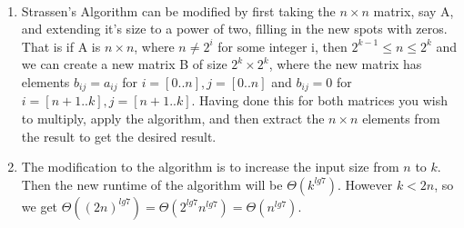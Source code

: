 \documentclass{assignment}
\begin{document}
\begin{problemlist}
\clearpage
\pbitem
\begin{problem}
\end{problem}
\begin{answer}
\\
\begin{enumerate}
\item
Strassen's Algorithm can be modified by first taking the $n\times n$ matrix, say A, and extending it's size to a power of two, filling in the new spots with zeros. That is if A is $n\times n$, where $n \neq 2^i$ for some integer i, then $2^{k-1} \le n \le 2^k$ and we can create a new matrix B of size $2^k\times 2^k$, where the new matrix has elements $b_{ij}=a_{ij}$ for $i=[0..n],j=[0..n]$ and $b_{ij}=0$ for $i=[n+1..k],j=[n+1..k]$. Having done this for both matrices you wish to multiply, apply the algorithm, and then extract the $n\times n$ elements from the result to get the desired result.\\
\item
The modification to the algorithm is to increase the input size from $n$ to $k$. Then the new runtime of the algorithm will be $\Theta (k^{lg 7})$. However $k<2n$, so we get $\Theta ((2n)^{lg 7})=\Theta (2^{lg 7}n^{lg 7})=\Theta (n^{lg 7})$.\\
\end{enumerate}
\end{answer}


\end{problemlist}
\end{document}
